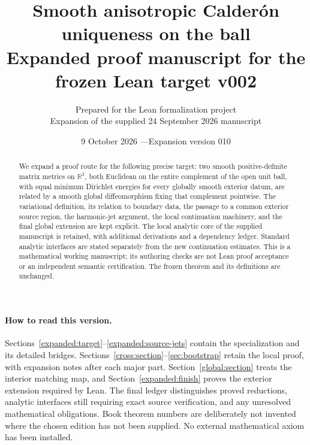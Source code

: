 \documentclass[11pt]{article}
\theoremstyle{definition}
\theoremstyle{remark}
\numberwithin{equation}{section}
\begin{document}

\title{Smooth anisotropic Calder\'on uniqueness on the ball\\[5pt]
\large Expanded proof manuscript for the frozen Lean target v002}
\author{Prepared for the Lean formalization project\\
\small Expansion of the supplied 24 September 2026 manuscript}
\date{9 October 2026 \quad---\quad Expansion version 010}
\maketitle
\begin{abstract}
We expand a proof route for the following precise target: two smooth
positive-definite matrix metrics on $\mathbb R^3$, both Euclidean on the
entire complement of the open unit ball, with equal minimum Dirichlet
energies for every globally smooth exterior datum, are related by a smooth
global diffeomorphism fixing that complement pointwise. The variational
definition, its relation to boundary data, the passage to a common exterior
source region, the harmonic-jet argument, the local continuation machinery,
and the final global extension are kept explicit. The local analytic core
of the supplied manuscript is retained, with additional derivations and a
dependency ledger. Standard analytic interfaces are stated separately from
the new continuation estimates. This is a mathematical working manuscript;
its authoring checks are not Lean proof acceptance or an independent
semantic certification. The frozen theorem and its definitions are unchanged.
\end{abstract}

\paragraph{How to read this version.}
Sections~\ref{expanded:target}--\ref{expanded:source-jets} contain the
specialization and its detailed bridges. Sections~\ref{cross:section}--\ref{sec:bootstrap}
retain the local proof, with expansion notes after each major part.
Section~\ref{global:section} treats the interior matching map, and
Section~\ref{expanded:finish} proves the exterior extension required by Lean.
The final ledger distinguishes proved reductions, analytic interfaces still
requiring exact source verification, and any unresolved mathematical obligations.
Book theorem numbers are deliberately not invented where the chosen edition
has not been supplied. No external mathematical axiom has been installed.
\end{document}
